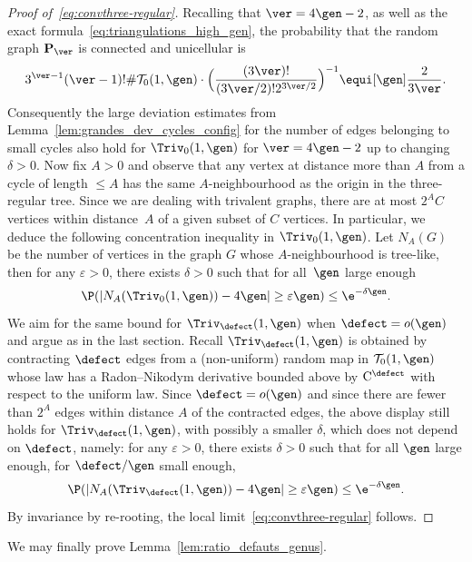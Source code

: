 \begin{proof}[Proof of~\eqref{eq:convthree-regular}]
Recalling that $\ver=4\gen-2$, as well as the exact formula~\eqref{eq:triangulations_high_gen}, the probability that the random graph $\mathbf{P}_{\ver}$ is connected and unicellular is
\[
{3^{\ver-1} (\ver-1)! \#\mathcal{T}_{0}(1,\gen)} \cdot \Bigl({ \frac{(3\ver)!}{(3\ver/2)! 2^{3\ver/2}}} \Bigr)^{-1}
\equi[\gen] \frac{2}{3\ver}.
\]
Consequently the large deviation estimates from Lemma~\ref{lem:grandes_dev_cycles_config} for the number of edges belonging to small cycles also hold for $ \Triv_{0}(1, \gen)$ for $\ver = 4 \gen-2$ up to changing $\delta >0$.
Now fix $A>0$ and observe that any vertex at distance more than $ A$ from a cycle of length $ \leq A$ has the same $A$-neighbourhood as the origin in the three-regular tree. Since we are dealing with trivalent graphs, there are at most $ 2^{A}C$ vertices within distance~$A$ of a given subset of $C$ vertices. In particular, we deduce the following concentration inequality in $ \Triv_{ 0}(1, \gen)$. Let $ N_{A}(G)$ be the number of vertices in the graph $G$ whose $A$-neighbourhood is tree-like, then for any $\varepsilon>0$, there exists $\delta >0$ such that for all~$\gen$ large enough
\[
\P(|N_{A}(\Triv_{ 0}(1, \gen)) - 4\gen| \geq \varepsilon \gen) \leq \e^{-\delta \gen}.
\]
We aim for the same bound for $\Triv_{\defect}(1, \gen)$ when $ \defect = o(\gen)$ and argue as in the last section. Recall $ \Triv_{ \defect}(1, \gen)$ is obtained by contracting $ \defect$ edges from a (non-uniform) random map in $\mathcal{T}_0(1, \gen)$ whose law has a Radon--Nikodym derivative bounded above by $\mathrm{C}^{ \defect}$ with respect to the uniform law. Since $ \defect = o(\gen)$ and since there are fewer than $2^{A}$ edges within distance $A$ of the contracted edges, the above display still holds for $ \Triv_{ \defect}(1, \gen)$, with possibly a smaller $\delta$, which does not depend on $\defect$, namely: for any $\varepsilon>0$, there exists $\delta >0$ such that for all $\gen$ large enough, for $\defect/\gen$ small enough,
\begin{equation}\label{eq:grandes_dev_high_gen}
\P(|N_{A}(\Triv_{\defect}(1, \gen)) - 4\gen| \geq \varepsilon \gen) \leq \e^{-\delta \gen}.
\end{equation}
By invariance by re-rooting, the local limit~\eqref{eq:convthree-regular} follows.
\end{proof}

We may finally prove Lemma~\ref{lem:ratio_defauts_genus}.

